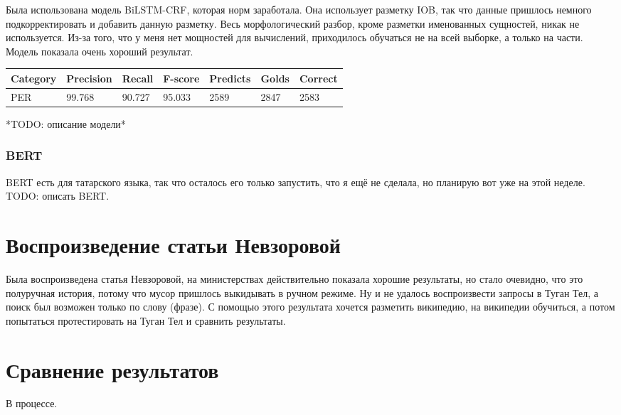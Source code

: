 Была использована модель BiLSTM-CRF, которая норм заработала. Она использует разметку IOB, так что данные пришлось немного подкорректировать и добавить данную разметку. Весь морфологический разбор, кроме разметки именованных сущностей, никак не используется. Из-за того, что у меня нет мощностей для вычислений, приходилось обучаться не на всей выборке, а только на части. Модель показала очень хороший результат.

\medskip

\begin{tabular}{| l | l | l | l | l | l | l |}
\hline
Category               & Precision  &   Recall   &  F-score   &  Predicts  &   Golds    &  Correct   \\

\hline
 PER                                 & 99.768     & 90.727     & 95.033     & 2589       & 2847       & 2583       \\
\hline
\end{tabular}



*TODO: описание модели*

\subsubsection{BERT}

BERT есть для татарского языка, так что осталось его только запустить, что я ещё не сделала, но планирую вот уже на этой неделе. TODO: описать BERT.


\section{Воспроизведение статьи Невзоровой}

Была воспроизведена статья Невзоровой, на министерствах действительно показала хорошие результаты, но стало очевидно, что это полуручная история, потому что мусор пришлось выкидывать в ручном режиме. Ну и не удалось воспроизвести запросы в Туган Тел, а поиск был возможен только по слову (фразе). С помощью этого результата хочется разметить википедию, на википедии обучиться, а потом попытаться протестировать на Туган Тел и сравнить результаты.

\section{Сравнение результатов}

В процессе.



